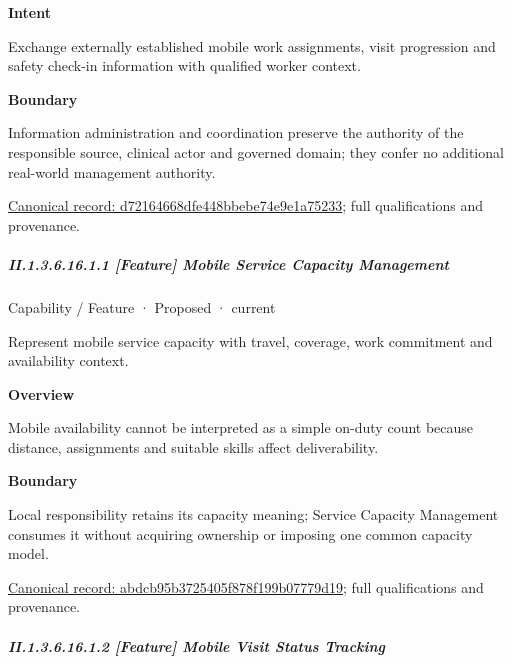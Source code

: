 \textbf{Intent}



Exchange externally established mobile work assignments, visit progression and safety check-in information with qualified worker context.



\textbf{Boundary}



Information administration and coordination preserve the authority of the responsible source, clinical actor and governed domain; they confer no additional real-world management authority.


{\footnotesize \href{../../../../continuum/strategy/capability/d72164668dfe448bbebe74e9e1a75233.md}{Canonical record: d72164668dfe448bbebe74e9e1a75233}; full qualifications and provenance.}\par
\subparagraph*{II.1.3.6.16.1.1 [Feature] Mobile Service Capacity Management}
\label{navigation:II.1.3.6.16.1.1}

\label{element:abdcb95b3725405f878f199b07779d19}
{\small Capability / Feature · Proposed · current}\par

Represent mobile service capacity with travel, coverage, work commitment and availability context.



\textbf{Overview}



Mobile availability cannot be interpreted as a simple on-duty count because distance, assignments and suitable skills affect deliverability.



\textbf{Boundary}



Local responsibility retains its capacity meaning; Service Capacity Management consumes it without acquiring ownership or imposing one common capacity model.


{\footnotesize \href{../../../../continuum/strategy/capability/feature/abdcb95b3725405f878f199b07779d19.md}{Canonical record: abdcb95b3725405f878f199b07779d19}; full qualifications and provenance.}\par
\subparagraph*{II.1.3.6.16.1.2 [Feature] Mobile Visit Status Tracking}
\label{navigation:II.1.3.6.16.1.2}

